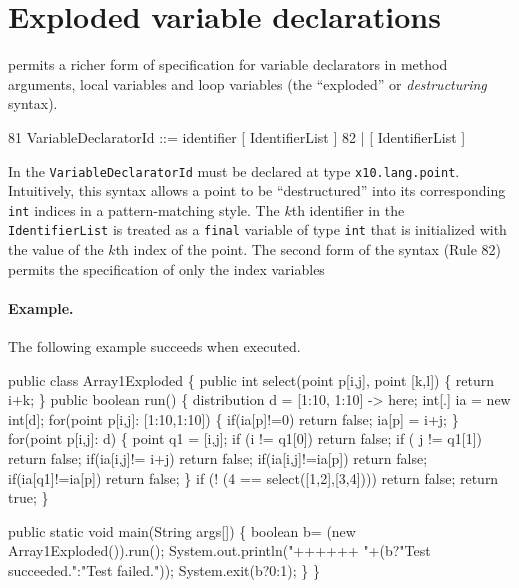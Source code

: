 \section{Exploded variable declarations}\label{exploded-syntax}

\Xten{} permits a richer form of specification for variable
declarators in method arguments, local variables and loop variables
(the ``exploded'' or {\em destructuring} syntax).
\begin{x10}
81    VariableDeclaratorId ::= 
           identifier [ IdentifierList ]
82       | [ IdentifierList ]
\end{x10}
In \XtenCurrVer{} the {\tt VariableDeclaratorId} must be declared at
type {\tt x10.lang.point}. Intuitively, this syntax allows a
point to be ``destructured'' into its corresponding {\tt int} 
indices in a pattern-matching style.
The $k$th identifier in the {\tt
IdentifierList} is treated as a {\tt final} variable of type {\tt int}
that is initialized with the value of the $k$th index of the point. 
The second form of the syntax (Rule 82) permits the specification of only
the index variables

\paragraph{Example.}
The following example succeeds when executed.
\begin{x10}
public class Array1Exploded \{
    public int select(point p[i,j], point [k,l]) \{
        return i+k;
    \}
    public boolean run() \{
        distribution d =  [1:10, 1:10] -> here;
        int[.] ia = new int[d];
        for(point p[i,j]: [1:10,1:10]) \{
            if(ia[p]!=0) return false;
            ia[p] = i+j;
        \}
        for(point p[i,j]: d) \{
            point q1 = [i,j];
            if (i != q1[0]) return false;
            if ( j != q1[1]) return false;
            if(ia[i,j]!= i+j) return false;
            if(ia[i,j]!=ia[p]) return false;
            if(ia[q1]!=ia[p]) return false;
        \}
        if (! (4 == select([1,2],[3,4]))) return false;
        return true;
   \}
        
   public static void main(String args[]) \{
        boolean b= (new Array1Exploded()).run();
        System.out.println("++++++ "+(b?"Test succeeded.":"Test failed."));
        System.exit(b?0:1);
   \}
\}
\end{x10}

 \par  %



